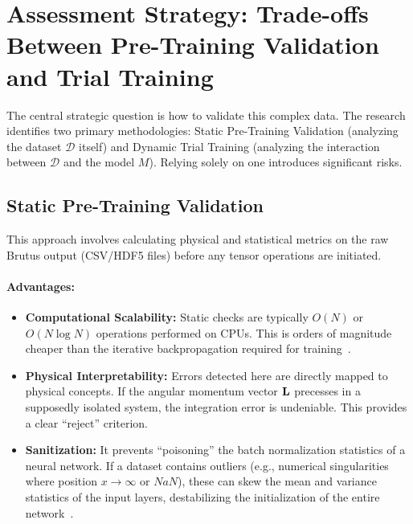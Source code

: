 \section{Assessment Strategy: Trade-offs Between Pre-Training Validation and Trial Training}

The central strategic question is how to validate this complex data. The research identifies two primary methodologies: Static Pre-Training Validation (analyzing the dataset $\mathcal{D}$ itself) and Dynamic Trial Training (analyzing the interaction between $\mathcal{D}$ and the model $M$). Relying solely on one introduces significant risks.

\subsection{Static Pre-Training Validation}

This approach involves calculating physical and statistical metrics on the raw Brutus output (CSV/HDF5 files) before any tensor operations are initiated.

\paragraph{Advantages:}
\begin{itemize}
    \item \textbf{Computational Scalability:} Static checks are typically $O(N)$ or $O(N \log N)$ operations performed on CPUs. This is orders of magnitude cheaper than the iterative backpropagation required for training~\cite{ref12}.
    \item \textbf{Physical Interpretability:} Errors detected here are directly mapped to physical concepts. If the angular momentum vector $\mathbf{L}$ precesses in a supposedly isolated system, the integration error is undeniable. This provides a clear ``reject'' criterion.
    \item \textbf{Sanitization:} It prevents ``poisoning'' the batch normalization statistics of a neural network. If a dataset contains outliers (e.g., numerical singularities where position $x \to \infty$ or $NaN$), these can skew the mean and variance statistics of the input layers, destabilizing the initialization of the entire network~\cite{ref13}.
\end{itemize}

